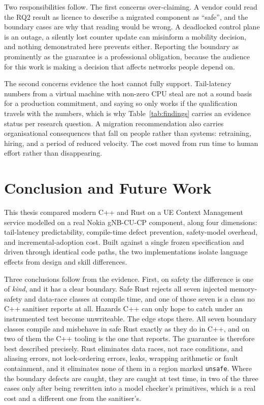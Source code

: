 \documentclass[english,oneside,a4paper,censored,csm,software-track-2020]{HYthesisML}
\begin{document}
Two responsibilities follow. The first concerns over-claiming. A vendor could read
the RQ2 result as licence to describe a migrated component as ``safe'', and the boundary cases
are why that reading would be wrong. A deadlocked control plane is an outage, a
silently lost counter update can misinform a mobility decision, and nothing demonstrated here
prevents either. Reporting the boundary as prominently as the guarantee is a
professional obligation, because the audience for this work is making a decision that affects
networks people depend on.

The second concerns evidence the host cannot fully support. Tail-latency numbers from a virtual
machine with non-zero CPU steal are not a sound basis for a production commitment, and saying so
only works if the qualification travels with the numbers, which is
why Table~\ref{tab:findings} carries an evidence status per research question. A migration
recommendation also carries organisational consequences that fall on people rather than systems:
retraining, hiring, and a period of reduced velocity. The cost moved from run time to human
effort rather than disappearing.

\chapter{Conclusion and Future Work\label{chapter:conclusions}}

This thesis compared modern C++ and Rust on a UE Context Management service modelled on a real
Nokia gNB-CU-CP component, along four dimensions: tail-latency predictability, compile-time
defect prevention, safety-model overhead, and incremental-adoption cost. Built against a single
frozen specification and driven through identical code paths, the two implementations isolate
language effects from design and skill differences.

Three conclusions follow from the evidence. First, on safety the difference is one of
\emph{kind}, and it has a clear boundary. Safe Rust rejects all seven injected memory-safety and
data-race classes at compile time, and one of those seven is a class no C++ sanitiser reports at
all. Hazards C++ can only hope to catch under an instrumented test become unwriteable. The edge
stops there.
All seven boundary
classes compile and misbehave in safe Rust exactly as they do in C++, and on two of them the C++
tooling is the one that reports. The guarantee is therefore best described precisely. Rust
eliminates data races, not race conditions, and aliasing errors, not lock-ordering errors,
leaks, wrapping arithmetic or fault containment, and it eliminates none of them in a region
marked \texttt{unsafe}. Where the boundary defects are caught, they are
caught at test time, in two of the three cases only after being rewritten into a model checker's
primitives, which is a real cost and a different one from the sanitiser's.
\end{document}
